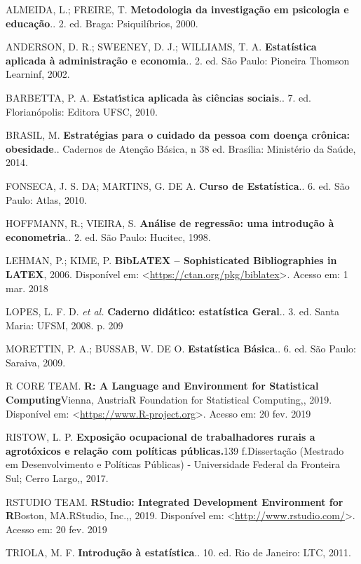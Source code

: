 \documentclass[12pt,brazil,oneside]{book}
\begin{document}
\leavevmode\hypertarget{ref-almeida2000}{}%
ALMEIDA, L.; FREIRE, T. \textbf{Metodologia da investigação em psicologia e educação}.. 2. ed. Braga: Psiquilíbrios, 2000.

\leavevmode\hypertarget{ref-anderson2002}{}%
ANDERSON, D. R.; SWEENEY, D. J.; WILLIAMS, T. A. \textbf{Estatística aplicada à administração e economia}.. 2. ed. São Paulo: Pioneira Thomson Learninf, 2002.

\leavevmode\hypertarget{ref-barbetta1988}{}%
BARBETTA, P. A. \textbf{Estatı́stica aplicada às ciências sociais}.. 7. ed. Florianópolis: Editora UFSC, 2010.

\leavevmode\hypertarget{ref-brasil2014}{}%
BRASIL, M. \textbf{Estratégias para o cuidado da pessoa com doença crônica: obesidade}.. Cadernos de Atenção Básica, n 38 ed. Brasília: Ministério da Saúde, 2014.

\leavevmode\hypertarget{ref-Fonseca2010}{}%
FONSECA, J. S. DA; MARTINS, G. DE A. \textbf{Curso de Estatística}.. 6. ed. São Paulo: Atlas, 2010.

\leavevmode\hypertarget{ref-hoffmann1998}{}%
HOFFMANN, R.; VIEIRA, S. \textbf{Análise de regressão: uma introdução à econometria}.. 2. ed. São Paulo: Hucitec, 1998.

\leavevmode\hypertarget{ref-biblatex}{}%
LEHMAN, P.; KIME, P. \textbf{BibLATEX -- Sophisticated Bibliographies in LATEX}, 2006. Disponível em: \textless{}\url{https://ctan.org/pkg/biblatex}\textgreater{}. Acesso em: 1 mar. 2018

\leavevmode\hypertarget{ref-lopes2008}{}%
LOPES, L. F. D. \emph{et al.} \textbf{Caderno didático: estatística Geral}.. 3. ed. Santa Maria: UFSM, 2008. p. 209

\leavevmode\hypertarget{ref-Morettin2009}{}%
MORETTIN, P. A.; BUSSAB, W. DE O. \textbf{Estatística Básica}.. 6. ed. São Paulo: Saraiva, 2009.

\leavevmode\hypertarget{ref-rcore}{}%
R CORE TEAM. \textbf{R: A Language and Environment for Statistical Computing}Vienna, AustriaR Foundation for Statistical Computing,, 2019. Disponível em: \textless{}\url{https://www.R-project.org}\textgreater{}. Acesso em: 20 fev. 2019

\leavevmode\hypertarget{ref-Ristow2017}{}%
RISTOW, L. P. \textbf{Exposição ocupacional de trabalhadores rurais a agrotóxicos e relação com políticas públicas.}139 f.Dissertação (Mestrado em Desenvolvimento e Políticas Públicas) - Universidade Federal da Fronteira Sul; Cerro Largo,, 2017.

\leavevmode\hypertarget{ref-teamrstudio}{}%
RSTUDIO TEAM. \textbf{RStudio: Integrated Development Environment for R}Boston, MA.RStudio, Inc.,, 2019. Disponível em: \textless{}\url{http://www.rstudio.com/}\textgreater{}. Acesso em: 20 fev. 2019

\leavevmode\hypertarget{ref-triola1999}{}%
TRIOLA, M. F. \textbf{Introdução à estatística}.. 10. ed. Rio de Janeiro: LTC, 2011.
\end{document}
